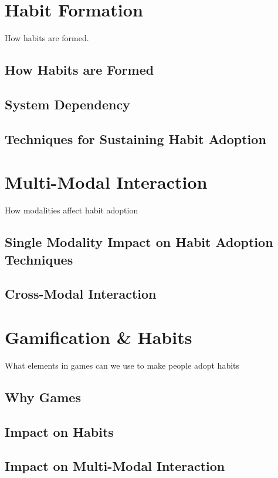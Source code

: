 \newpage
\section{Habit Formation}
How habits are formed.

\subsection{How Habits are Formed}


\subsection{System Dependency}


\subsection{Techniques for Sustaining Habit Adoption}


\newpage
\section{Multi-Modal Interaction}
How modalities affect habit adoption

\subsection{Single Modality Impact on Habit Adoption Techniques}


\subsection{Cross-Modal Interaction}

\newpage
\section{Gamification \& Habits}
What elements in games can we use to make people adopt habits

\subsection{Why Games}

\subsection{Impact on Habits}


\subsection{Impact on Multi-Modal Interaction}



